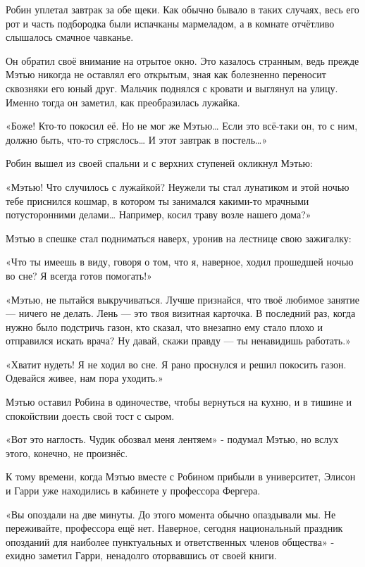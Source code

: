 \documentclass[a4paper,12pt]{book}
\begin{document}
\par
Робин уплетал завтрак за обе щеки. Как обычно бывало в таких случаях, весь его рот и часть подбородка были испачканы мармеладом, а в комнате отчётливо слышалось смачное чавканье.
\par
Он обратил своё внимание на отрытое окно. Это казалось странным, ведь прежде Мэтью никогда не оставлял его открытым, зная как болезненно переносит сквозняки его юный друг. Мальчик поднялся с кровати и выглянул на улицу. Именно тогда он заметил, как преобразилась лужайка.
\par
«Боже! Кто-то покосил её. Но не мог же Мэтью… Если это всё-таки он, то с ним, должно быть, что-то стряслось… И этот завтрак в постель…»
\par
Робин вышел из своей спальни и с верхних ступеней окликнул Мэтью:
\par
«Мэтью! Что случилось с лужайкой? Неужели ты стал лунатиком и этой ночью тебе приснился кошмар, в котором ты занимался какими-то мрачными потусторонними делами… Например, косил траву возле нашего дома?»
\par
Мэтью в спешке стал подниматься наверх, уронив на лестнице свою зажигалку:
\par
«Что ты имеешь в виду, говоря о том, что я, наверное, ходил прошедшей ночью во сне? Я всегда готов помогать!»
\par
«Мэтью, не пытайся выкручиваться. Лучше признайся, что твоё любимое занятие — ничего не делать. Лень — это твоя визитная карточка. В последний раз, когда нужно было подстричь газон, кто сказал, что внезапно ему стало плохо и отправился искать врача? Ну давай, скажи правду — ты ненавидишь работать.»
\par
«Хватит нудеть! Я не ходил во сне. Я рано проснулся и решил покосить газон. Одевайся живее, нам пора уходить.»
\par
Мэтью оставил Робина в одиночестве, чтобы вернуться на кухню, и в тишине и спокойствии доесть свой тост с сыром.
\par
«Вот это наглость. Чудик обозвал меня лентяем» - подумал Мэтью, но вслух этого, конечно, не произнёс.\\
\par
К тому времени, когда Мэтью вместе с Робином прибыли в университет, Элисон и Гарри уже находились в кабинете у профессора Фергера.
\par
«Вы опоздали на две минуты. До этого момента обычно опаздывали мы. Не переживайте, профессора ещё нет. Наверное, сегодня национальный праздник опозданий для наиболее пунктуальных и ответственных членов общества» - ехидно заметил Гарри, ненадолго оторвавшись от своей книги.
\end{document}
